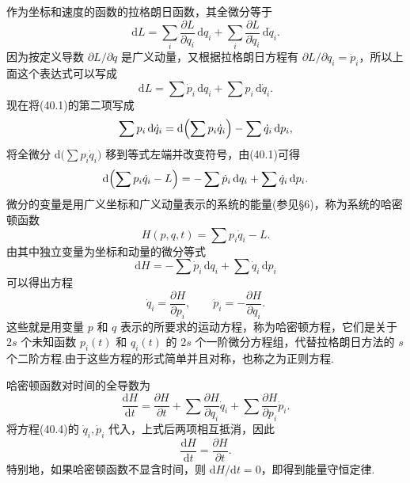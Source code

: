 作为坐标和速度的函数的拉格朗日函数，其全微分等于
\begin{equation*}
  \mathrm{d}L=\sum_i\frac{\partial L}{\partial q_i}\,\mathrm{d}q_i
  +\sum_i\frac{\partial L}{\partial\dot{q}_i}\,\mathrm{d}\dot{q}_i.
\end{equation*}
因为按定义导数 $\partial L/\partial\dot{q}$ 是广义动量，又根据拉格朗日方程有
$\partial L/\partial q_i=\dot{p}_i$，所以上面这个表达式可以写成
\begin{equation}
  \mathrm{d}L=\sum\dot{p}_i\,\mathrm{d}q_i+\sum p_i\,\mathrm{d}\dot{q}_i.
\end{equation}
现在将(40.1)的第二项写成
\begin{equation*}
  \sum p_i\,\mathrm{d}\dot{q}_i
  =\mathrm{d}\Bigl(\sum p_i\dot{q}_i\Bigr)-\sum\dot{q}_i\,\mathrm{d}p_i,
\end{equation*}
将全微分 $\mathrm{d}\bigl(\sum p_i\dot{q}_i\bigr)$ 移到等式左端并改变符号，由(40.1)可得
\begin{equation*}
  \mathrm{d}\Bigl(\sum p_i\dot{q}_i-L\Bigr)
  =-\sum\dot{p}_i\,\mathrm{d}q_i+\sum\dot{q}_i\,\mathrm{d}p_i.
\end{equation*}
微分的变量是用广义坐标和广义动量表示的系统的能量(参见§6)，称为系统的哈密顿函数
\begin{equation}
  H(p,q,t)=\sum p_i\dot{q}_i-L.
\end{equation}
由其中独立变量为坐标和动量的微分等式
\begin{equation}
  \mathrm{d}H=-\sum\dot{p}_i\,\mathrm{d}q_i+\sum\dot{q}_i\,\mathrm{d}p_i
\end{equation}
可以得出方程
\begin{equation}
  \dot{q}_i=\frac{\partial H}{\partial p_i},\qquad
  \dot{p}_i=-\frac{\partial H}{\partial q_i}.
\end{equation}
这些就是用变量 $p$ 和 $q$ 表示的所要求的运动方程，称为哈密顿方程，它们是关于 $2s$
个未知函数 $p_i(t)$ 和 $q_i(t)$ 的 $2s$ 个一阶微分方程组，代替拉格朗日方法的 $s$
个二阶方程.由于这些方程的形式简单并且对称，也称之为正则方程.

哈密顿函数对时间的全导数为
\begin{equation*}
  \frac{\mathrm{d}H}{\mathrm{d}t}
  =\frac{\partial H}{\partial t}
  +\sum\frac{\partial H}{\partial q_i}\dot{q}_i
  +\sum\frac{\partial H}{\partial p_i}\dot{p}_i.
\end{equation*}
将方程(40.4)的 $\dot{q}_i,\dot{p}_i$ 代入，上式后两项相互抵消，因此
\begin{equation}
  \frac{\mathrm{d}H}{\mathrm{d}t}=\frac{\partial H}{\partial t}.
\end{equation}
特别地，如果哈密顿函数不显含时间，则 $\mathrm{d}H/\mathrm{d}t=0$，即得到能量守恒定律.

